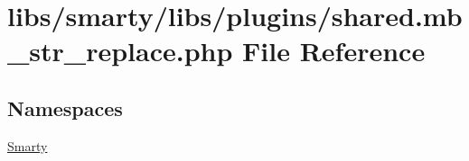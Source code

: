 \hypertarget{shared_8mb__str__replace_8php}{}\section{libs/smarty/libs/plugins/shared.mb\+\_\+str\+\_\+replace.\+php File Reference}
\label{shared_8mb__str__replace_8php}
\subsection*{Namespaces}
\begin{DoxyCompactItemize}
\item 
 \hyperlink{namespace_smarty}{Smarty}
\end{DoxyCompactItemize}

